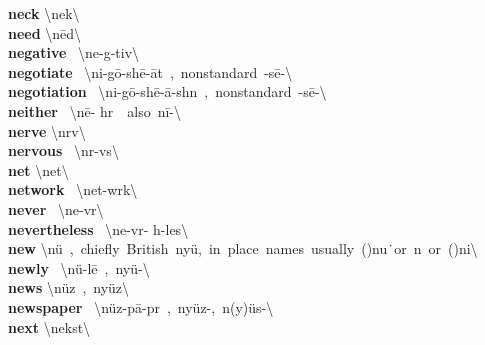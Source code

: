 \documentclass[10pt,a4paper]{article}
\begin{document}
\begin{multicols}{2}
\textbf{ neck }\quad \textbackslash \textprimstress nek\textbackslash \\
\textbf{ need }\quad \textbackslash \textprimstress n\={e}d\textbackslash \\
\textbf{ negative }\quad \ \textbackslash \textprimstress ne-g\textschwa -tiv\textbackslash \\
\textbf{ negotiate }\quad \ \textbackslash ni-\textprimstress g\={o}-sh\={e}-\textsecstress \={a}t\ ,\ nonstandard\ -s\={e}-\textbackslash \\
\textbf{ negotiation }\quad \ \textbackslash ni-\textsecstress g\={o}-sh\={e}-\textprimstress \={a}-sh\textschwa n\ ,\ nonstandard\ -s\={e}-\textbackslash \\
\textbf{ neither }\quad \ \textbackslash \textprimstress n\={e}- h\textschwa r\ \ also\ \textprimstress n\={i}-\textbackslash \\
\textbf{ nerve }\quad \textbackslash \textprimstress n\textschwa rv\textbackslash \\
\textbf{ nervous }\quad \ \textbackslash \textprimstress n\textschwa r-v\textschwa s\textbackslash \\
\textbf{ net }\quad \textbackslash \textprimstress net\textbackslash \\
\textbf{ network }\quad \ \textbackslash \textprimstress net-\textsecstress w\textschwa rk\textbackslash \\
\textbf{ never }\quad \ \textbackslash \textprimstress ne-v\textschwa r\textbackslash \\
\textbf{ nevertheless }\quad \ \textbackslash \textsecstress ne-v\textschwa r- h\textschwa -\textprimstress les\textbackslash \\
\textbf{ new }\quad \textbackslash \textprimstress n\"{u}\ ,\ chiefly\ British\ \textprimstress ny\"{u},\ in\ place\ names\ usually\ (\textsecstress )nu\. \ or\ n\textschwa \ or\ (\textsecstress )ni\textbackslash \\
\textbf{ newly }\quad \ \textbackslash \textprimstress n\"{u}-l\={e}\ ,\ \textprimstress ny\"{u}-\textbackslash \\
\textbf{ news }\quad \textbackslash \textprimstress n\"{u}z\ ,\ \textprimstress ny\"{u}z\textbackslash \\
\textbf{ newspaper }\quad \ \textbackslash \textprimstress n\"{u}z-\textsecstress p\={a}-p\textschwa r\ ,\ \textprimstress ny\"{u}z-,\ \textprimstress n(y)\"{u}s-\textbackslash \\
\textbf{ next }\quad \textbackslash \textprimstress nekst\textbackslash \\

\end{multicols}
\end{document}
